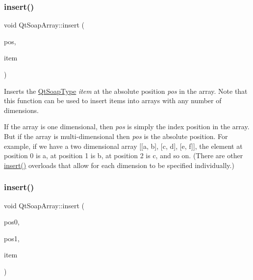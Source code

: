 \subsubsection{\texorpdfstring{insert()}{insert()}\hspace{0.1cm}{\footnotesize\ttfamily [1/5]}}
{\footnotesize\ttfamily void Qt\+Soap\+Array\+::insert (\begin{DoxyParamCaption}\item[{int}]{pos,  }\item[{\mbox{\hyperlink{class_qt_soap_type}{Qt\+Soap\+Type}} $\ast$}]{item }\end{DoxyParamCaption})}

Inserts the \mbox{\hyperlink{class_qt_soap_type}{Qt\+Soap\+Type}} {\itshape item} at the absolute position {\itshape pos} in the array. Note that this function can be used to insert items into arrays with any number of dimensions.

If the array is one dimensional, then {\itshape pos} is simply the index position in the array. But if the array is multi-\/dimensional then {\itshape pos} is the absolute position. For example, if we have a two dimensional array \mbox{[}\mbox{[}\textquotesingle{}a\textquotesingle{}, \textquotesingle{}b\textquotesingle{}\mbox{]}, \mbox{[}\textquotesingle{}c\textquotesingle{}, \textquotesingle{}d\textquotesingle{}\mbox{]}, \mbox{[}\textquotesingle{}e\textquotesingle{}, \textquotesingle{}f\textquotesingle{}\mbox{]}\mbox{]}, the element at position 0 is \textquotesingle{}a\textquotesingle{}, at position 1 is \textquotesingle{}b\textquotesingle{}, at position 2 is \textquotesingle{}c\textquotesingle{}, and so on. (There are other \mbox{\hyperlink{class_qt_soap_array_a7be8113dc4c686e1ea243b988269f50d}{insert()}} overloads that allow for each dimension to be specified individually.) \mbox{\label{class_qt_soap_array_ae53bbc75f10af211b8c02e0e62a3260a}} 
\subsubsection{\texorpdfstring{insert()}{insert()}\hspace{0.1cm}{\footnotesize\ttfamily [2/5]}}
{\footnotesize\ttfamily void Qt\+Soap\+Array\+::insert (\begin{DoxyParamCaption}\item[{int}]{pos0,  }\item[{int}]{pos1,  }\item[{\mbox{\hyperlink{class_qt_soap_type}{Qt\+Soap\+Type}} $\ast$}]{item }\end{DoxyParamCaption})}

